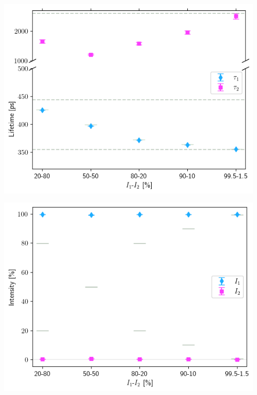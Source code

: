 \begin{minipage}{.47\linewidth}
     
    \includegraphics[width=\linewidth]{Batch 7/355-444/output/2 life/lifetimes.png}
    \label{fig:355-444-2life}
\end{minipage}
\hfill
\begin{minipage}{.47\linewidth}
     
    \includegraphics[width=\linewidth]{Batch 7/355-444/output/2 life/intensities.png}
    \label{fig:355-444-2lifeint}
\end{minipage}
